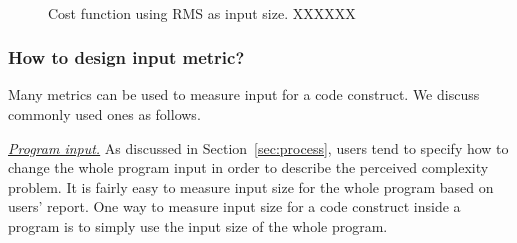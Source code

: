 \begin{figure}
\centering
{} 
 \\ 
\vspace{-0.1in}
\caption{Cost function using RMS as input size. XXXXXX} 
\label{fig:heat} 
\end{figure} 


\subsubsection{How to design input metric?}
Many metrics can be used to measure input for a code construct. 
We discuss commonly used ones as follows.

\underline{\textit{Program input.}}
As discussed in Section~\ref{sec:process}, 
users tend to specify how to change the whole program 
input in order to describe the perceived complexity problem.
It is fairly easy to measure input size for the whole program based on users' report.
One way to measure input size for a code construct inside a program
is to simply use the input size of the whole program. 

